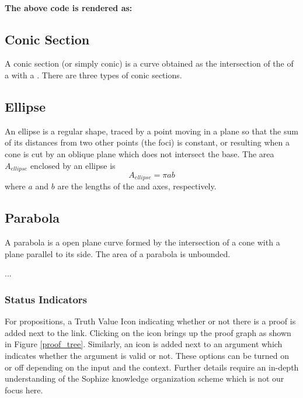 \documentclass[a4paper]{article}
\begin{document}
\paragraph{The above code is rendered as:}
\begin{mdframed}
\section*{Conic Section}
A conic section (or simply conic) is a curve obtained as the intersection of the  of a  with a . There are three types of conic sections.

\subsection*{Ellipse}
An ellipse is a regular  shape, traced by a point moving in a plane so that the sum of its distances from two other points (the foci) is constant, or resulting when a cone is cut by an oblique plane which does not intersect the base.  The area $A_{ellipse}$ enclosed by an ellipse is $$A_{ellipse} = \pi a b$$where $a$ and $b$ are the lengths of the  and  axes, respectively.

\subsection*{Parabola}
A parabola is a  open plane curve formed by the intersection of a cone with a plane parallel to its side. The area of a parabola is unbounded.

...

\end{mdframed}

\subsubsection{Status Indicators}

For propositions, a Truth Value Icon indicating whether or not there is a proof is added next to the link. Clicking on the icon brings up the proof graph as shown in Figure \ref{proof_tree}. Similarly, an icon is added next to an argument which indicates whether the argument is valid or not. These options can be turned on or off depending on the input and the context. Further details require an in-depth understanding of the Sophize knowledge organization scheme which is not our focus here.
\end{document}
